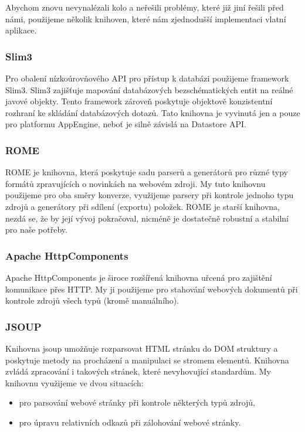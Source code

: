 Abychom znovu nevynalézali kolo a neřešili problémy, které již jiní řešili před námi, použijeme několik knihoven, které nám zjednodušší implementaci vlatní aplikace.

\subsubsection{Slim3}
Pro obalení nízkoúrovňového API pro přístup k databázi použijeme framework Slim3.
Slim3 zajišťuje mapování databázových bezschématických entit na reálné javové objekty.
Tento framework zároveň poskytuje objektově konzistentní rozhraní ke skládání databázových dotazů.
Tato knihovna je vyvinutá jen a pouze pro platformu AppEngine, neboť je silně závislá na Datastore API.

\subsubsection{ROME}
ROME je knihovna, která poskytuje sadu parserů a generátorů pro různé typy formátů zpravujících o novinkách na webovém zdroji.
My tuto knihovnu použijeme pro oba směry konverze, využijeme parsery při kontrole jednoho typu zdrojů a generátory při sdílení (exportu) položek.
ROME je starší knihovna, nezdá se, že by její vývoj pokračoval, nicméně je dostatečně robustní a stabilní pro naše potřeby.

\subsubsection{Apache HttpComponents}
Apache HttpComponents je široce rozšířená kni\-hov\-na uřcená pro zajištění komunikace přes HTTP.
My ji použijeme pro stahování webových dokumentů při kontrole zdrojů všech typů (kromě manuálního).

\subsubsection{JSOUP}
Knihovna jsoup umožňuje rozparsovat HTML stránku do DOM struktury a poskytuje metody na procházení a manipulaci se stromem elementů.
Knihovna zvládá zpracování i takových stránek, které nevyhovující standardům.
My knihovnu využijeme ve dvou situacích:
\begin{itemize}
    \item pro parsování webové stránky při kontrole některých typů zdrojů,
    \item pro úpravu relativních odkazů při zálohování webové stránky.
\end{itemize}

